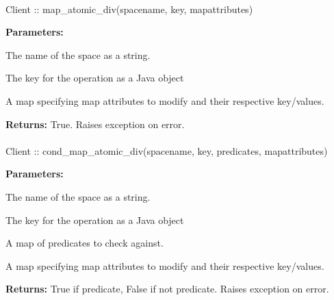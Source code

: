 \paragraph{}
\label{api:java:map_atomic_div}
\begin{javacode}
Client :: map_atomic_div(spacename, key, mapattributes)
\end{javacode}


\noindent\textbf{Parameters:}
\begin{description}[labelindent=\widthof{{\code{mapattributes}}},leftmargin=*,noitemsep,nolistsep,align=right]
\item[\code{spacename}] The name of the space as a string.
\item[\code{key}] The key for the operation as a Java object
\item[\code{mapattributes}] A map specifying map attributes to modify and their respective key/values.
\end{description}

\noindent\textbf{Returns:}
True.  Raises exception on error.

\paragraph{}
\label{api:java:cond_map_atomic_div}
\begin{javacode}
Client :: cond_map_atomic_div(spacename, key, predicates, mapattributes)
\end{javacode}


\noindent\textbf{Parameters:}
\begin{description}[labelindent=\widthof{{\code{mapattributes}}},leftmargin=*,noitemsep,nolistsep,align=right]
\item[\code{spacename}] The name of the space as a string.
\item[\code{key}] The key for the operation as a Java object
\item[\code{predicates}] A map of predicates to check against.
\item[\code{mapattributes}] A map specifying map attributes to modify and their respective key/values.
\end{description}

\noindent\textbf{Returns:}
True if predicate, False if not predicate.  Raises exception on error.


